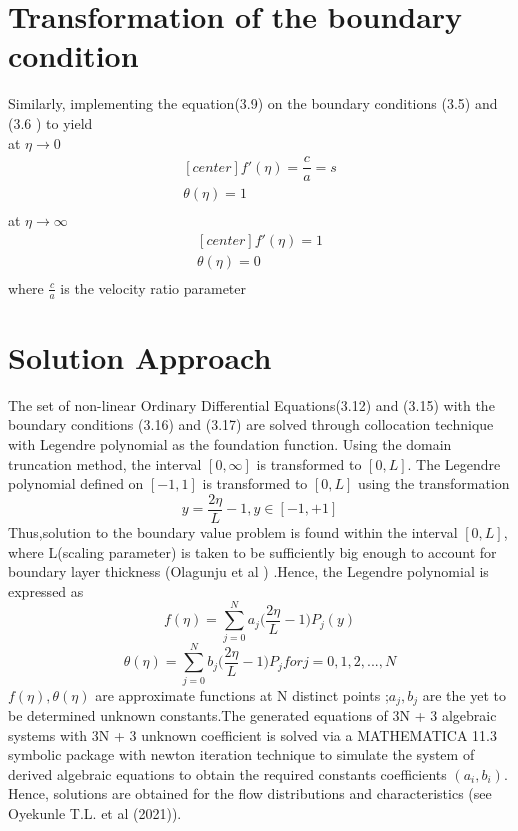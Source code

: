 \documentclass[a4paper,12pt]{report}
\begin{document}
{\section{Transformation of the boundary condition}
Similarly, implementing the equation(3.9) on the boundary conditions (3.5) and (3.6 ) to yield\\
at $\eta \longrightarrow 0$
\begin{equation}
	\begin{aligned}[center]
		f'(\eta) = \dfrac{c}{a} =s\\
		\theta(\eta) = 1\\
	\end{aligned}
\end{equation}
at $\eta \longrightarrow \infty$
\begin{equation}
	\begin{aligned}[center]
		f'(\eta) = 1\\
		\theta(\eta) = 0\\
	\end{aligned}
\end{equation}
where $\frac{c}{a}$ is the velocity ratio parameter
\section{Solution Approach}
The set of non-linear Ordinary Differential Equations(3.12) and (3.15) with the boundary conditions (3.16) and (3.17) are solved through collocation technique with Legendre polynomial as the foundation function. Using the domain truncation method, the interval $[0,\infty]$ is transformed to $[0,L]$. The Legendre polynomial defined on $[-1,1]$ is transformed to $[0,L]$ using the transformation
\begin{equation}
	y=\frac{2\eta}{L}-1,  y\in[-1,+1] 
\end{equation}
Thus,solution to the boundary value problem is found within the interval $[0,L]$, where L(scaling parameter) is taken to be sufficiently big enough to account for boundary layer thickness (Olagunju et al ) .Hence, the Legendre polynomial is expressed as
\begin{equation}
f(\eta) = \sum_{j=0}^{N}a_j\big(\frac{2\eta}{L} - 1)P_j(y)
\end{equation}
\begin{equation}
\theta(\eta) = \sum_{j=0}^{N}b_j\big(\frac{2\eta}{L} - 1)P_j for j = 0,1,2,...,N
\end{equation}
$f(\eta), \theta(\eta)$ are approximate functions at N distinct points ;$a_j, b_j$ are the yet to be determined unknown constants.The generated equations of 3N + 3 algebraic systems with 3N + 3 unknown coefficient is solved via a MATHEMATICA 11.3 symbolic package with newton iteration technique to simulate the system of derived algebraic equations to obtain the required constants coefficients $( a_i ,b_i)$. Hence, solutions are obtained for the flow distributions and characteristics (see Oyekunle T.L. et al (2021)).

}
\end{document}

